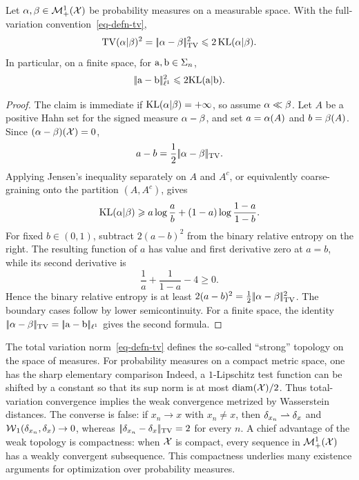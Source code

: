 \begin{thm}\label{thm-pinsker}
	Let $\alpha,\beta\in\mathcal{M}_+^1(\mathcal{X})$ be probability measures on a measurable space. With the full-variation convention~\eqref{eq-defn-tv},
	\[
		\operatorname{TV}(\alpha|\beta)^2
		=
		|\!| \alpha-\beta |\!|_{\operatorname{TV}}^2
		\leqslant
		2\operatorname{KL}(\alpha|\beta).
	\]
	In particular, on a finite space, for $\mathrm{a},\mathrm{b}\in\Sigma_n$,
	\[
		|\!| \mathrm{a}-\mathrm{b} |\!|_{\ell^1}^2
		\leqslant
		2\mathrm{KL}(\mathrm{a}|\mathrm{b}).
	\]
\end{thm}

\begin{proof}
	The claim is immediate if $\operatorname{KL}(\alpha|\beta)=+\infty$, so assume $\alpha\ll\beta$. Let $A$ be a positive Hahn set for the signed measure $\alpha-\beta$, and set $a=\alpha(A)$ and $b=\beta(A)$. Since $(\alpha-\beta)(\mathcal{X})=0$,
	\[
		a-b
		=
		\frac12|\!| \alpha-\beta |\!|_{\operatorname{TV}}.
	\]
	Applying Jensen's inequality separately on $A$ and $A^c$, or equivalently coarse-graining onto the partition $(A,A^c)$, gives
	\[
		\operatorname{KL}(\alpha|\beta)
		\geqslant
		a\log\frac{a}{b}
		+(1-a)\log\frac{1-a}{1-b}.
	\]
	For fixed $b\in(0,1)$, subtract $2(a-b)^2$ from the binary relative entropy on the right. The resulting function of $a$ has value and first derivative zero at $a=b$, while its second derivative is
	\[
		\frac1a+\frac1{1-a}-4\geq0.
	\]
	Hence the binary relative entropy is at least $2(a-b)^2=\frac12|\!| \alpha-\beta |\!|_{\operatorname{TV}}^2$. The boundary cases follow by lower semicontinuity. For a finite space, the identity $|\!| \alpha-\beta |\!|_{\operatorname{TV}}=|\!| \mathrm{a}-\mathrm{b} |\!|_{\ell^1}$ gives the second formula.
\end{proof}

\begin{rem}
		The total variation norm~\eqref{eq-defn-tv} defines the so-called ``strong'' topology on the space of measures.
	For probability measures on a compact metric space, one has the sharp elementary comparison
	Indeed, a $1$-Lipschitz test function can be shifted by a constant so that its sup norm is at most $\operatorname{diam}(\mathcal{X})/2$. Thus total-variation convergence implies the weak convergence metrized by Wasserstein distances.
	The converse is false: if $x_n\to x$ with $x_n\neq x$, then $\delta_{x_n}\rightharpoonup\delta_x$ and $\operatorname{\mathcal{W}}_1(\delta_{x_n},\delta_x)\to0$, whereas $|\!| \delta_{x_n}-\delta_x |\!|_{\operatorname{TV}}=2$ for every $n$.
	A chief advantage of the weak topology is compactness: when $\mathcal{X}$ is compact, every sequence in $\mathcal{M}_+^1(\mathcal{X})$ has a weakly convergent subsequence. This compactness underlies many existence arguments for optimization over probability measures.
\end{rem}


